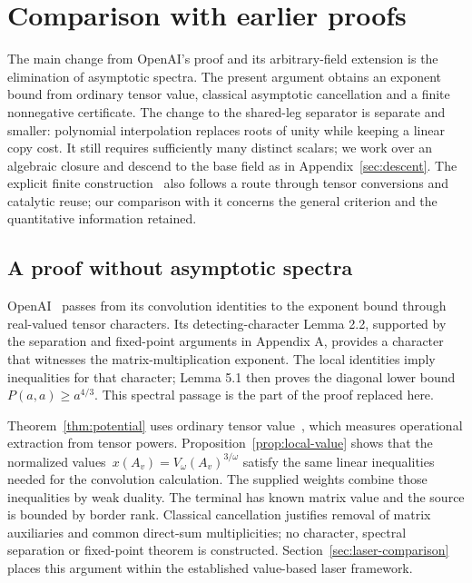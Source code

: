 \documentclass[11pt,letterpaper]{article}
\theoremstyle{definition}
\numberwithin{equation}{section}
\begin{document}
\section{Comparison with earlier proofs}
\label{sec:comparison}

The main change from OpenAI's proof and its arbitrary-field extension is the elimination of asymptotic spectra. The present argument obtains an exponent bound from ordinary tensor value, classical asymptotic cancellation and a finite nonnegative certificate. The change to the shared-leg separator is separate and smaller: polynomial interpolation replaces roots of unity while keeping a linear copy cost. It still requires sufficiently many distinct scalars; we work over an algebraic closure and descend to the base field as in Appendix~\ref{sec:descent}. The explicit finite construction~\cite{Extraction} also follows a route through tensor conversions and catalytic reuse; our comparison with it concerns the general criterion and the quantitative information retained.

\subsection{A proof without asymptotic spectra}

OpenAI~\cite{OpenAI} passes from its convolution identities to the exponent bound through real-valued tensor characters. Its detecting-character Lemma 2.2, supported by the separation and fixed-point arguments in Appendix A, provides a character that witnesses the matrix-multiplication exponent. The local identities imply inequalities for that character; Lemma 5.1 then proves the diagonal lower bound~$P(a,a)\geq a^{4/3}$. This spectral passage is the part of the proof replaced here.

Theorem~\ref{thm:potential} uses ordinary tensor value~\cite{DS13,LG14,AFL15}, which measures operational extraction from tensor powers. Proposition~\ref{prop:local-value} shows that the normalized values~$x(A_v)=V_\omega(A_v)^{3/\omega}$ satisfy the same linear inequalities needed for the convolution calculation. The supplied weights combine those inequalities by weak duality. The terminal has known matrix value and the source is bounded by border rank. Classical cancellation justifies removal of matrix auxiliaries and common direct-sum multiplicities; no character, spectral separation or fixed-point theorem is constructed. Section~\ref{sec:laser-comparison} places this argument within the established value-based laser framework.
\end{document}
